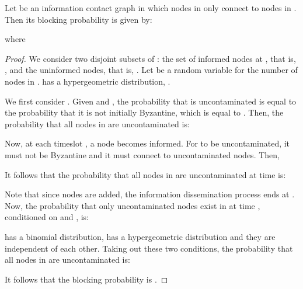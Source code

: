 \begin{theorem}\label{th:1}
Let  be an information contact graph in which nodes in  only connect to nodes in . Then its blocking probability  is given by:

\vspace{-0.3cm}


where
\vspace{-0.3cm}


\end{theorem}

\vspace{0.2cm}

\begin{proof}
We consider two disjoint subsets of :  the set of informed nodes at , that is, , and the uninformed nodes, that is, .
Let  be a random variable for the number of nodes in .  has a hypergeometric distribution, .

We first consider . Given  and , the probability that  is uncontaminated is equal to the probability that it is not initially Byzantine, which is equal to .
Then, the probability that all nodes in  are uncontaminated is:

\vspace{-0.6cm}


Now, at each timeslot , a node  becomes informed. For  to be uncontaminated, it must not be Byzantine and it must connect to  uncontaminated nodes. Then,

\vspace{-0.6cm}


It follows that the probability that all nodes in  are uncontaminated at time  is:

\vspace{-0.7cm}


Note that since  nodes are added, the information dissemination process ends at . Now, the probability that only uncontaminated nodes exist in  at time , conditioned on  and , is:

\vspace{-0.5cm}






 has a binomial distribution,  has a hypergeometric distribution and they are independent of each other. Taking out these two conditions, the probability that all nodes in  are uncontaminated is:

\vspace{-0.5cm}


It follows that the blocking probability is .
\end{proof}

